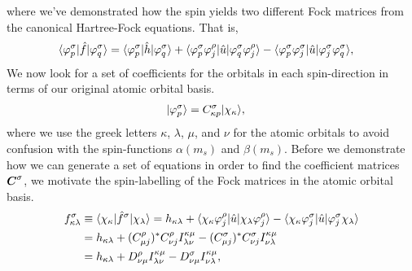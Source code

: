             where we've demonstrated how the spin yields two different Fock
            matrices from the canonical Hartree-Fock equations.
            That is,
            \begin{align}
                \langle \varphi^{\sigma}_{p} |\hat{f}| \varphi^{\sigma}_{q} \rangle
                &=
                \langle \varphi^{\sigma}_{p} |
                \hat{h}
                | \varphi^{\sigma}_{q} \rangle
                +
                \langle \varphi^{\sigma}_{p}\varphi^{\rho}_{j} |
                \hat{u}
                | \varphi^{\sigma}_{q}\varphi^{\rho}_{j} \rangle
                -
                \langle \varphi^{\sigma}_{p}\varphi^{\sigma}_{j} |
                \hat{u}
                | \varphi^{\sigma}_{j}\varphi^{\sigma}_{q} \rangle,
            \end{align}
            We now look for a set of coefficients for the orbitals in each
            spin-direction in terms of our original atomic orbital basis.
            \begin{align}
                | \varphi^{\sigma}_{p} \rangle
                &= C^{\sigma}_{\kappa p} | \chi_{\kappa} \rangle,
            \end{align}
            where we use the greek letters $\kappa$, $\lambda$, $\mu$, and $\nu$
            for the atomic orbitals to avoid confusion with the spin-functions
            $\alpha(m_s)$ and $\beta(m_s)$.
            Before we demonstrate how we can generate a set of equations in
            order to find the coefficient matrices $\boldsymbol{C}^{\sigma}$, we
            motivate the spin-labelling of the Fock matrices in the atomic
            orbital basis.
            \begin{align}
                f^{\sigma}_{\kappa\lambda}
                &\equiv
                \langle \chi_{\kappa} |\hat{f}^{\sigma}| \chi_{\lambda} \rangle
                =
                h_{\kappa\lambda}
                + \langle \chi_{\kappa}\varphi^{\rho}_{j} |
                \hat{u}
                | \chi_{\lambda}\varphi^{\rho}_{j} \rangle
                - \langle \chi_{\kappa}\varphi^{\sigma}_{j} |
                \hat{u}
                | \varphi^{\sigma}_{j}\chi_{\lambda} \rangle
                \\
                &=
                h_{\kappa\lambda}
                +
                (C^{\rho}_{\mu j})^{*}
                C^{\rho}_{\nu j}
                I^{\kappa\mu}_{\lambda\nu}
                -
                (C^{\sigma}_{\mu j})^{*}
                C^{\sigma}_{\nu j}
                I^{\kappa\mu}_{\nu\lambda}
                \\
                &=
                h_{\kappa\lambda}
                +
                D^{\rho}_{\nu\mu}
                I^{\kappa\mu}_{\lambda\nu}
                -
                D^{\sigma}_{\nu\mu}
                I^{\kappa\mu}_{\nu\lambda},
            \end{align}
